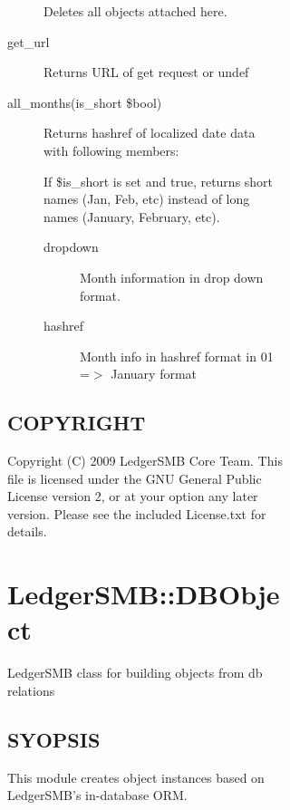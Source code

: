 \begin{description}
\begin{description}
\begin{description}
\begin{description}
\begin{description}
\begin{description}
Deletes all objects attached here.


\item[{get\_url}] \mbox{}

Returns URL of get request or undef


\item[{all\_months(is\_short \$bool)}] \mbox{}

Returns hashref of localized date data with following members:



If \$is\_short is set and true, returns short names (Jan, Feb, etc) instead of 
long names (January, February, etc).

\begin{description}

\item[{dropdown}] \mbox{}

Month information in drop down format.


\item[{hashref}] \mbox{}

Month info in hashref format in 01 =$>$ January format

\end{description}
\end{description}
\subsection*{COPYRIGHT\label{LedgerSMB::App_State_COPYRIGHT}}


Copyright (C) 2009 LedgerSMB Core Team.  This file is licensed under the GNU 
General Public License version 2, or at your option any later version.  Please
see the included License.txt for details.

\section{LedgerSMB::DBObject\label{LedgerSMB::DBObject}}


LedgerSMB class for building objects from db relations

\subsection*{SYOPSIS\label{LedgerSMB::DBObject_SYOPSIS}}


This module creates object instances based on LedgerSMB's in-database ORM.


\end{description}
\end{description}
\end{description}
\end{description}
\end{description}
